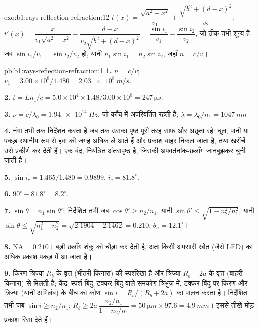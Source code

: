 \begin{solution}{exo:b1:rays-reflection-refraction:12}
$t(x) = \dfrac{\sqrt{a^2 + x^2}}{v_1} + \dfrac{\sqrt{b^2 + (d - x)^2}}{v_2}$;
$t'(x) = \dfrac{x}{v_1\sqrt{a^2 + x^2}} - \dfrac{d - x}{v_2\sqrt{b^2 + (d - x)^2}}
= \dfrac{\sin i_1}{v_1} - \dfrac{\sin i_2}{v_2}$, जो ठीक तभी शून्य है जब
$\sin i_1/v_1 = \sin i_2/v_2$ हो, यानी $n_1\sin i_1 = n_2\sin i_2$, जहाँ
$n = c/v$।
\end{solution}

\begin{solution}{pb:b1:rays-reflection-refraction:1}
\textbf{1.} $n = c/v$; $v_1 = 3.00\times10^8/1.480 = \qty{2.03e8}{m/s}$.

\textbf{2.} $t = Ln_1/c = 5.0\times10^4 \times 1.48/3.00\times10^8 =
\qty{247}{\micro s}$.

\textbf{3.} $\nu = c/\lambda_0 = \qty{1.94e14}{Hz}$, जो काँच में अपरिवर्तित रहती है;
$\lambda = \lambda_0/n_1 = \qty{1047}{nm}$।

\textbf{4.} नंगा  तभी तक निर्देशन करता है जब तक उसका पृष्ठ पूरी तरह
साफ़ और अछूता रहे: धूल, पानी या पकड़ स्थानीय रूप से हवा की जगह अधिक 
ले आते हैं और प्रकाश बाहर निकल जाता है, तथा खरोंचें उसे प्रकीर्ण कर देती हैं।
 एक बंद, नियंत्रित अंतरापृष्ठ है, जिसकी अपवर्तनांक-छलाँग जानबूझकर चुनी
जाती है।

\textbf{5.} $\sin i_c = 1.465/1.480 = 0.9899$, $i_c = 81.8^\circ$.

\textbf{6.} $90^\circ - 81.8^\circ = 8.2^\circ$.

\textbf{7.} $\sin\theta = n_1\sin\theta'$; निर्देशित तभी जब $\cos\theta' \geq
n_2/n_1$, यानी $\sin\theta' \leq \sqrt{1 - n_2^2/n_1^2}$, यानी
$\sin\theta \leq \sqrt{n_1^2 - n_2^2} = \sqrt{2.1904 - 2.1462} = 0.210$:
$\theta_a = 12.1^\circ$।

\textbf{8.} $\mathrm{NA} = 0.210$। बड़ी छलाँग शंकु को चौड़ा कर देती है, अतः
किसी अपसारी स्रोत (जैसे LED) का अधिक प्रकाश पकड़ में आ जाता है।

\textbf{9.} किरण त्रिज्या $R_b$ के वृत्त (भीतरी किनारा) की स्पर्शरेखा है
और त्रिज्या $R_b + 2a$ के वृत्त (बाहरी किनारा) से मिलती है; केंद्र--स्पर्श
बिंदु--टक्कर बिंदु वाले समकोण त्रिभुज में, टक्कर बिंदु पर किरण और त्रिज्या
(यानी अभिलंब) के बीच का कोण
$\sin i = R_b/(R_b + 2a)$ का पालन करता है। निर्देशित तभी जब $\sin i \geq n_2/n_1$:
$R_b \geq 2a\,\dfrac{n_2/n_1}{1 - n_2/n_1} = \qty{50}{\micro m} \times 97.6
= \qty{4.9}{mm}$। इससे तीखे मोड़ प्रकाश रिसा देते हैं।


\end{solution}

